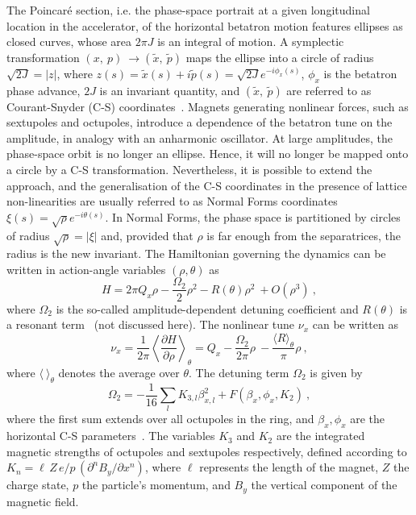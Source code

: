 \documentclass{article}
\begin{document}
The Poincar\'e section, i.e. the phase-space portrait at a given longitudinal location in the accelerator, of the horizontal betatron motion features ellipses as closed curves, whose area $2\pi J$ is an integral of motion. A symplectic transformation $(x,\ p)\ \rightarrow (\tilde{x},\ \tilde{p})$ maps the ellipse into a circle of radius $\sqrt{2J}=|z|$, where $z(s)=\tilde{x}(s)+i\tilde{p}(s)=\sqrt{2J}e^{-i\phi_x(s)}$, $\phi_x$ is the betatron phase advance, $2J$ is an invariant quantity, and  $(\tilde{x},\ \tilde{p})$ are referred to as Courant-Snyder (C-S) coordinates~\cite{courant}. Magnets generating nonlinear forces, such as sextupoles and octupoles, introduce a dependence of the betatron tune on the amplitude, in analogy with an anharmonic oscillator. At large amplitudes, the phase-space orbit is no longer an ellipse. Hence, it will no longer be mapped onto a circle by a C-S transformation. Nevertheless, it is possible to extend the approach, and the generalisation of the C-S coordinates in the presence of lattice non-linearities are usually referred to as Normal Forms coordinates~\cite{giallo} $\xi(s)=\sqrt{\rho}e^{-i\theta(s)}$. In Normal Forms, the phase space is partitioned by circles of radius $\sqrt{\rho}=|\xi|$ and, provided that $\rho$ is far enough from the separatrices, the radius is the new invariant. The Hamiltonian governing the dynamics can be written in action-angle variables $(\rho,\theta)$ as
%
\begin{equation}\label{eq:hamilton}
H=2\pi Q_x\rho -\frac{\Omega_2}{2}\rho^2 - R(\theta)\rho^2\ 
  +O(\rho^3)\ ,
\end{equation}
%
where $\Omega_2$ is the so-called amplitude-dependent detuning coefficient and $R(\theta)$ is a resonant term~\cite{diego} (not discussed here). The nonlinear tune $\nu_x$ can be written as 
%
\begin{equation}\label{eq:detuning}
\nu_x=\frac{1}{2\pi} \left \langle 
\frac{\partial H}{\partial \rho} \right \rangle_{\theta}
     = Q_x-\frac{\Omega_2}{2\pi}\rho\ -\frac{\langle R \rangle_{\theta}}{\pi}%
\rho\ ,
\end{equation}
%
where $\langle\ \rangle_{\theta}$ denotes the average over $\theta$. The detuning term $\Omega_2$ is given by~\cite{diego}
%
\begin{equation}
\Omega_2=-\frac{1}{16}\sum_l{K_{3,l}\beta_{x,l}^2} + 
	F(\beta_x,\phi_x, K_{2})\ ,
\end{equation}
%
where the first sum extends over all octupoles in the ring, and $\beta_x, \phi_x$ are the horizontal C-S parameters~\cite{courant}. The variables $K_{3}$ and $K_{2}$ are the integrated magnetic strengths of octupoles and sextupoles respectively, defined according to $K_n=\ell\,Z\,e/p \, (\partial^nB_y/\partial x^n) $, where $\ell$ represents the length of the magnet, $Z$ the charge state, $p$ the particle's momentum, and $B_y$ the vertical component of the magnetic field. 
\end{document}
